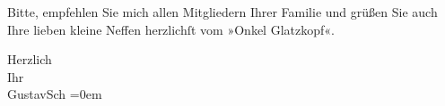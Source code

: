 \pstart
           Bitte, empfehlen Sie mich allen Mitgliedern Ihrer Familie und grüßen Sie auch Ihre
               lieben kleine Neffen
               herzlichſt vom »Onkel Glatzkopf«.\pend
           
\pstart
           Herzlich{\\[\baselineskip]}Ihr{\\[\baselineskip]}\spacefill\mbox{GustavSch}\pend
           \leftskip=0em{}\endnumbering{}
\begin{anhang}
\end{anhang}\newcommand{\dateiname}{L04295}\newcommand{\titel}{Gustav Schwarzkopf an Arthur Schnitzler, 17. 8. 1899}\newcommand{\editorInnen}{Herausgegeben von Jahnke, SelmaMüller, Martin Anton}
